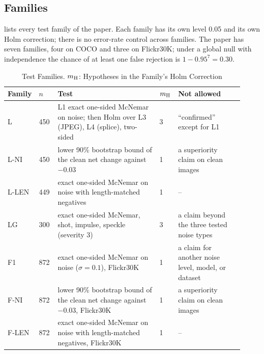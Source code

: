 \documentclass[journal,onecolumn]{IEEEtran}
\theoremstyle{plain}
\begin{document}
\subsection{Families}
 lists every test family of the paper.
Each family has its own level 0.05 and its own Holm correction; there is no error-rate control across families.
The paper has seven families, four on COCO and three on Flickr30K; under a global null with independence the chance of at least one false rejection is $1-0.95^{7}=0.30$.

\begin{table}[!htbp]
\centering
\caption{Test Families. $m_{\rm H}$: Hypotheses in the Family's Holm Correction}
\label{stab:families}
\footnotesize
\setlength{\tabcolsep}{3pt}
\begin{tabular}{p{0.07\linewidth}p{0.08\linewidth}p{0.44\linewidth}p{0.05\linewidth}p{0.28\linewidth}}
\toprule
Family & $n$ & Test & $m_{\rm H}$ & Not allowed \\
\midrule
L & 450 & L1 exact one-sided McNemar on noise; then Holm over L3 (JPEG), L4 (splice), two-sided & 3 & ``confirmed'' except for L1 \\
L-NI & 450 & lower 90\% bootstrap bound of the clean net change against $-0.03$ & 1 & a superiority claim on clean images \\
L-LEN & 449 & exact one-sided McNemar on noise with length-matched negatives & 1 & -- \\
LG & 300 & exact one-sided McNemar, shot, impulse, speckle (severity 3) & 3 & a claim beyond the three tested noise types \\
F1 & 872 & exact one-sided McNemar on noise ($\sigma=0.1$), Flickr30K & 1 & a claim for another noise level, model, or dataset \\
F-NI & 872 & lower 90\% bootstrap bound of the clean net change against $-0.03$, Flickr30K & 1 & a superiority claim on clean images \\
F-LEN & 872 & exact one-sided McNemar on noise with length-matched negatives, Flickr30K & 1 & -- \\
\bottomrule
\end{tabular}
\end{table}
\end{document}
